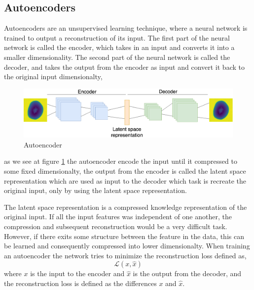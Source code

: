 \documentclass[11pt]{article}
\begin{document}
\subsection{Autoencoders}

Autoencoders are an unsupervised learning technique, where a neural network is trained to output a reconstruction of its input. The first part of the neural network is called the encoder, which takes in an input and converts it into a smaller dimensionality. The second part of the neural network is called the decoder, and takes the output from the encoder as input and convert it back to the original input dimensionalty,

\begin{figure}[!h]
    \centering
    \includegraphics[width=1.0\textwidth]{figurer/autoencoder.png}
    \caption{Autoencoder}
    \label{fig:autoencoder}
\end{figure}

as we see at figure \ref{fig:autoencoder} the autoencoder encode the input until it compressed to some fixed dimensionalty, the output from the encoder is called the latent space representation which are used as input to the decoder which task is recreate the original input, only by using the latent space representation. 

The latent space representation is a compressed knowledge representation of the original input. If all the input features was independent of one another, the compression and subsequent reconstruction would be a very difficult task. However, if there exits some structure between the feature in the data, this can be learned and consequently compressed into lower dimensionalty. When training an autoencoder the network tries to minimize the reconstruction loss defined as,
\begin{equation}
    \mathcal{L}(x, \hat{x})
\end{equation}
where $x$ is the input to the encoder and $\hat{x}$ is the output from the decoder, and the reconstruction loss is defined as the differences $x$ and $\hat{x}$.
\end{document}
